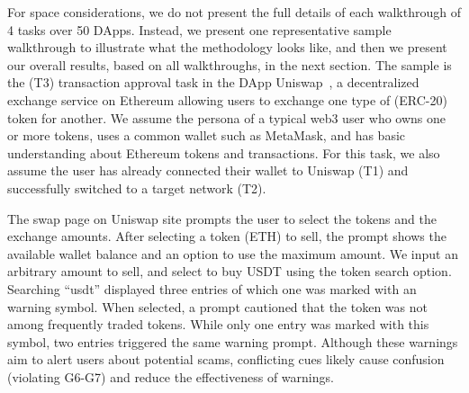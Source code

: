 \documentclass[conference]{IEEEtran}
\begin{document}
For space considerations, we do not present the full details of each walkthrough of 4 tasks over 50 DApps. Instead, we present one representative sample walkthrough to illustrate what the methodology looks like, and then we present our overall results, based on all walkthroughs, in the next section.
The sample is the (T3) transaction approval task in the DApp Uniswap~\cite{uniswap}, a decentralized exchange service on Ethereum allowing users to exchange one type of (ERC-20) token for another.
We assume the persona of a typical web3 user who owns one or more tokens, uses a common wallet such as MetaMask, and has basic understanding about Ethereum tokens and transactions.
For this task, we also assume the user has already connected their wallet to Uniswap (T1) and successfully switched to a target network (T2). %

The swap page on Uniswap site prompts the user to select the tokens and the exchange amounts.
After selecting a token (ETH) to sell, the prompt shows the available wallet balance and an option to use the maximum amount. We input an arbitrary amount to sell,
and select to buy USDT using the token search option.
Searching ``usdt'' displayed three entries of which one was marked with an warning symbol. When selected, a prompt cautioned that the token was not among frequently traded tokens.
While only one entry was marked with this symbol, two entries triggered the same warning prompt.
Although these warnings aim to alert users about potential scams, conflicting cues likely cause confusion (violating G6-G7) and reduce the effectiveness of warnings.
\end{document}
